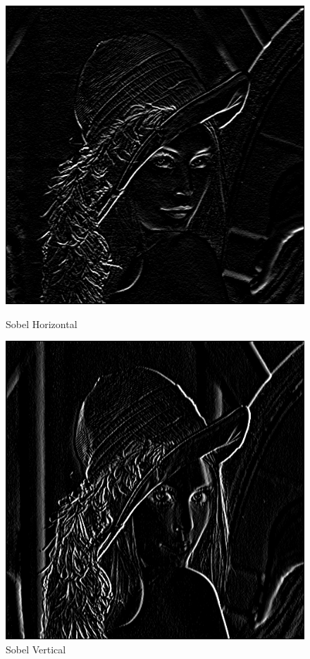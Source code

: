 \documentclass[11pt]{article}
\begin{document}
	\begin{figure}[H]
		\begin{minipage}[c]{.46\linewidth}
			\centering
			\includegraphics[scale=0.25]{Image/filtreSobelHorizontal.png}
			\caption{Sobel Horizontal}
			\label{fig:SobelHorizontal}
		\end{minipage} \hfill
		\begin{minipage}[c]{.46\linewidth}
		\centering
			\includegraphics[scale=0.25]{Image/filtreSobelVertical.png}
			\caption{Sobel Vertical}
			\label{fig:SobelVertical}
		\end{minipage}
	\end{figure}
\end{document}
